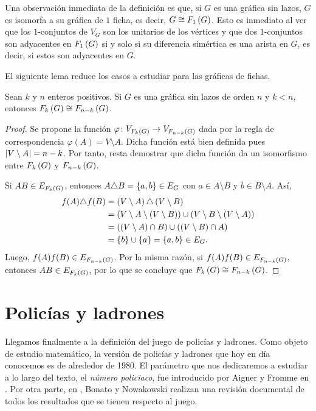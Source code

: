 Una observaci\'on inmediata de la definici\'on es que, si $G$ es una gr\'afica
sin lazos, $G$ es isomorfa a su gr\'afica de $1$ ficha, es decir, $G\cong
F_{1}\left( G\right)$. Esto es inmediato al ver que los $1$-conjuntos de $V_G$ son los
unitarios de los v\'ertices y que dos $1$-conjuntos son adyacentes en $F_{1}\left( G\right)$
si y solo si su diferencia sim\'ertica es una arista en $G$, es decir, si estos
son adyacentes en $G$.

El siguiente lema reduce los casos a estudiar para las gr\'aficas de fichas.

\begin{lema}
  \label{lem:isomorfismo}
      Sean $k$ y $n$ enteros positivos. Si $G$ es una gr\'afica sin lazos de
      orden $n$ y $k < n$, entonces $F_{k}\left( G\right) \cong F_{n-k}\left( G\right)$.
  \end{lema}

  \begin{proof}
    Se propone la funci\'on $\varphi \colon V_{F_{k}\left( G\right)} \to V_{F_{n-k}\left( G\right)}$
    dada por la regla de correspondencia $\varphi(A) = V\setminus A$. Dicha
    funci\'on est\'a bien definida pues $\left|V\setminus A\right| = n-k$. Por tanto,
    resta demostrar que dicha funci\'on da un isomorfismo entre $F_{k}\left( G\right)$ y
    $F_{n-k}\left( G\right)$.

    Si $AB\in E_{F_{k}\left( G\right)}$, entonces $A\triangle B =\left\{ a,b\right\}\in E_G$ con $a\in
    A\setminus B$ y $b\in B\setminus A$. As\'i,
    \begin{align*}
      f(A)\triangle f(B) 
        &= \left( V\setminus A\right)\triangle \left( V\setminus B\right) \\
        &= \left( V\setminus A \setminus \left( V\setminus B\right)\right) \cup 
           \left( V\setminus B \setminus \left( V\setminus A\right)\right)\\
        &= \left( \left( V\setminus A\right) \cap B\right) \cup \left( \left( V\setminus B\right)  \cap A\right)\\
        &= \left\{ b\right\} \cup \left\{ a\right\} = \left\{ a,b\right\}\in E_G.
    \end{align*}
    Luego, $f(A)f(B)\in E_{F_{n-k}\left( G\right)}$. Por la misma raz\'on, si $f(A)f(B)\in
    E_{F_{n-k}\left( G\right)}$, entonces $AB\in E_{F_{k}\left( G\right)}$, por lo que se concluye que
    $F_{k}\left( G\right) \cong F_{n-k}\left( G\right)$.

  \end{proof}

\section{Polic\'ias y ladrones}

Llegamos finalmente a la definici\'on del juego de polic\'ias y ladrones. Como
objeto de estudio matem\'atico, la versi\'on de polic\'ias y ladrones que hoy en
d\'ia conocemos es de alrededor de 1980. El par\'ametro que nos dedicaremos a
estudiar a lo largo del texto, el \textit{n\'umero policiaco}, fue introducido
por Aigner y Fromme en \cite{aignerDAM8}. Por otra parte, en \cite{bonato},
Bonato y Nowakowski realizan una revisi\'on documental de todos los resultados
que se tienen respecto al juego.

